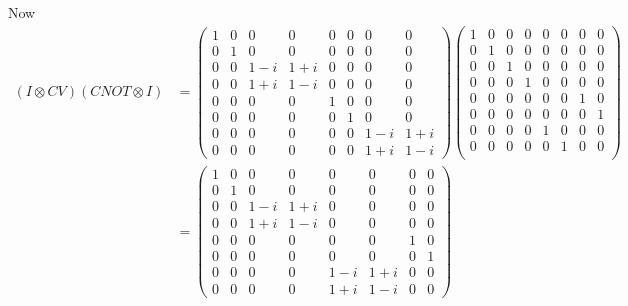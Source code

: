 \documentclass[10pt]{article}
\begin{document}
Now
\begin{align*}
(I \otimes CV)(CNOT \otimes I)
&= 
\begin{pmatrix}
1 & 0 & 0 & 0 & 0 & 0 & 0 & 0 \\
0 & 1 & 0 & 0 & 0 & 0 & 0 & 0 \\
0 & 0 & 1 - i & 1 + i & 0 & 0 & 0 & 0 \\
0 & 0 & 1 + i & 1 - i & 0 & 0 & 0 & 0 \\
\hline
0 & 0 & 0 & 0 & 1 & 0 & 0 & 0 \\
0 & 0 & 0 & 0 & 0 & 1 & 0 & 0 \\
0 & 0 & 0 & 0 & 0 & 0 & 1-i & 1+i \\
0 & 0 & 0 & 0 & 0 & 0 & 1+i & 1-i
\end{pmatrix}
\begin{pmatrix}
1 & 0 & 0 & 0 & 0 & 0 & 0 & 0 \\
0 & 1 & 0 & 0 & 0 & 0 & 0 & 0 \\
0 & 0 & 1 & 0 & 0 & 0 & 0 & 0 \\
0 & 0 & 0 & 1 & 0 & 0 & 0 & 0 \\
\hline 
0 & 0 & 0 & 0 & 0 & 0 & 1 & 0 \\
0 & 0 & 0 & 0 & 0 & 0 & 0 & 1\\
0 & 0 & 0 & 0 & 1 & 0 & 0 & 0 \\
0 & 0 & 0 & 0 & 0 & 1 & 0 & 0 \\ 
\end{pmatrix} \\
&= 
\begin{pmatrix}
1 & 0 & 0      & 0    & 0   & 0    & 0 & 0 \\
0 & 1 & 0      & 0    & 0   & 0    & 0 & 0 \\
0 & 0 & 1 - i & 1+i & 0    & 0    & 0 & 0 \\
0 & 0 & 1+i  & 1-i  & 0    & 0    & 0 & 0 \\
0 & 0 & 0      & 0    & 0    & 0    & 1 & 0 \\
0 & 0 & 0      & 0    & 0    & 0    & 0 & 1 \\
0 & 0 & 0      & 0    & 1-i & 1+i & 0 & 0 \\
0 & 0 & 0      & 0    & 1+i & 1-i & 0 & 0 
\end{pmatrix}
\end{align*}
\end{document}
